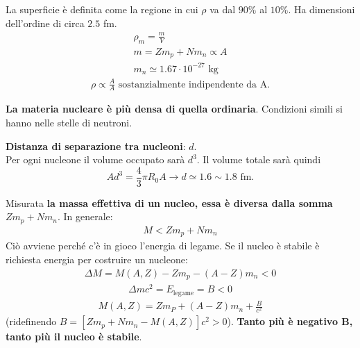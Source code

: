 \documentclass[a4paper,11pt,twoside,openany]{book}
\theoremstyle{definition}
\theoremstyle{plain}
\theoremstyle{plain}
\theoremstyle{definition}
\begin{document}
La superficie è definita come la regione in cui $\rho$ va dal $90\%$ al $10\%$. Ha dimensioni dell'ordine di circa $2.5$ fm.
\begin{equation}\begin{split}
\rho_m=\frac{m}{V}\\
m=Zm_p+Nm_n\propto A\\
m_n\simeq1.67\cdot 10^{-27}\textrm{ kg}
\end{split}\end{equation}
\begin{equation}\begin{split}
\rho\propto \frac{A}{A} \textrm{ sostanzialmente indipendente da A.}
\end{split}\end{equation}

\textbf{La materia nucleare è più densa di quella ordinaria}. Condizioni simili si hanno nelle stelle di neutroni.

\textbf{Distanza di separazione tra nucleoni}: $d$. \\
Per ogni nucleone il volume occupato sarà $d^3$. Il volume totale sarà quindi $$Ad^3=\frac{4}{3}\pi R_0A \longrightarrow d\simeq 1.6\sim 1.8 \textrm{ fm}.$$

Misurata \textbf{la massa effettiva di un nucleo, essa è diversa dalla somma $Zm_p+Nm_n$}. In generale:
\begin{equation}\begin{split}
M<Zm_p+Nm_n
\end{split}\end{equation} 
Ciò avviene perché c'è in gioco l'energia di legame. Se il nucleo è stabile è richiesta energia per costruire un nucleone:
\begin{equation}\begin{split}
\Delta M=M\left(A,Z\right)-Zm_p-\left(A-Z\right)m_n<0
\end{split}\end{equation}
\begin{equation}\begin{split}
\Delta mc^2=E_{\textrm{legame}}=B<0
\end{split}\end{equation}
\begin{equation}\begin{split}
M\left(A,Z\right)=Zm_P+\left(A-Z\right)m_n+\frac{B}{c^2}
\end{split}\end{equation}
(ridefinendo $B=\left[Zm_p+Nm_n-M\left(A,Z\right)\right]c^2>0$). \textbf{Tanto più è negativo B, tanto più il nucleo è stabile}.
\end{document}
